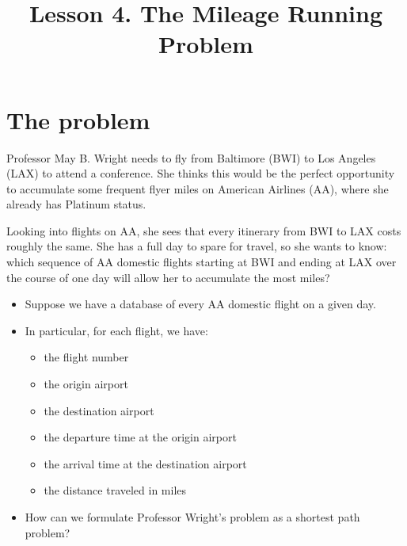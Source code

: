\documentclass{SA367Spring2020}
\begin{document}
\title{Lesson 4. The Mileage Running Problem}

\maketitle

\section{The problem}\label{the-problem}

Professor May B. Wright needs to fly from Baltimore (BWI) to Los Angeles
(LAX) to attend a conference. She thinks this would be the perfect
opportunity to accumulate some frequent flyer miles on American Airlines
(AA), where she already has Platinum status.

Looking into flights on AA, she sees that every itinerary from BWI to
LAX costs roughly the same. She has a full day to spare for travel, so
she wants to know: which sequence of AA domestic flights starting at BWI
and ending at LAX over the course of one day will allow her to
accumulate the most miles?

\begin{itemize}
  \item Suppose we have a database of every AA domestic flight on a given day.
  \item In particular, for each flight, we have:
    \begin{itemize}
      \item the flight number
      \item the origin airport
      \item the destination airport
      \item the departure time at the origin airport
      \item the arrival time at the destination airport
      \item the distance traveled in miles
    \end{itemize}
  \item How can we formulate Professor Wright's problem as a shortest path
    problem?
\end{itemize}
\end{document}

